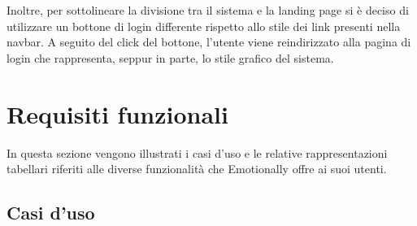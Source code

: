 Inoltre, per sottolineare la divisione tra il sistema e la landing page si è 
deciso di utilizzare un bottone di login differente rispetto allo stile dei 
link presenti nella navbar. A seguito del click del bottone, l'utente viene 
reindirizzato alla pagina di login che rappresenta, seppur in parte, lo stile 
grafico del sistema.

\section{Requisiti funzionali}\label{sec:requisiti-funzionali}

In questa sezione vengono illustrati i casi d'uso e le relative 
rappresentazioni tabellari riferiti alle diverse funzionalità che Emotionally 
offre ai suoi utenti. 

\subsection{Casi d'uso}
